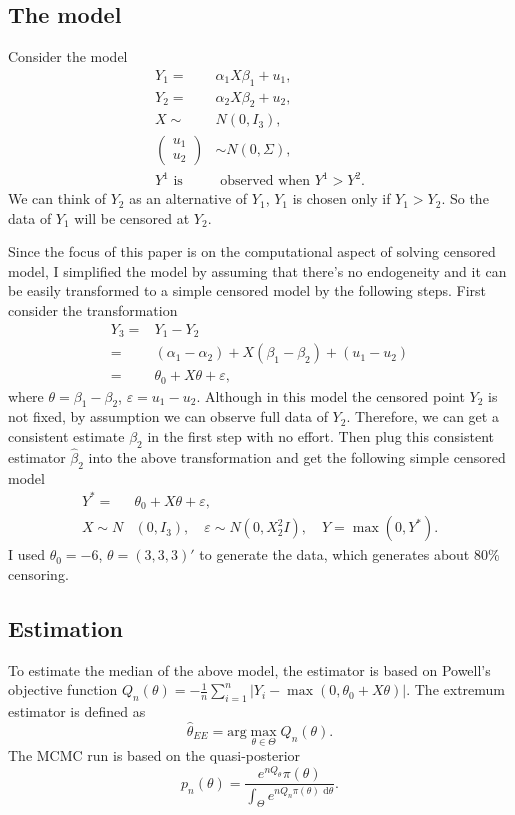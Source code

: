 \documentclass[12pt]{article}
\theoremstyle{plain} \newtheorem{theorem}{Theorem}
\theoremstyle{definition} \newtheorem{definition}{Definition}
\begin{document}
\subsection{The model}
Consider the model
\begin{align*}
  Y_1 = & \alpha_1 X\beta_1 +u_1, \\
  Y_2 = & \alpha_2 X\beta_2 +u_2, \\
  X \sim & N(0,I_3), \\
  \left( \begin{array}{c} u_1 \\ u_2 \end{array} \right)& \sim  N(0,\Sigma), \\
  Y^1 \mbox{ is}& \mbox{ observed when } Y^1> Y^2.
\end{align*}
We can think of $Y_2$ as an alternative of $Y_1$, $Y_1$ is chosen only if $Y_1>Y_2$. So the data of $Y_1$ will be censored at $Y_2$.

Since the focus of this paper is on the computational aspect of solving censored model, I simplified the model by assuming that there's no endogeneity and it can be easily transformed to a simple censored model by the following steps. First consider the transformation
\begin{align*}
  Y_3 = & Y_1 -Y_2 \\
  = & (\alpha_1 - \alpha_2) + X(\beta_1 - \beta_2) +(u_1 - u_2) \\
  = & \theta_0 + X\theta + \varepsilon,
\end{align*}
where $\theta = \beta_1 - \beta_2$, $\varepsilon = u_1 -u_2$. Although in this model the censored point $Y_2$ is not fixed, by assumption we can observe full data of $Y_2$. Therefore, we can get a consistent estimate $\beta_2$ in the first step with no effort. Then plug this consistent estimator $\hat{\beta}_2$ into the above transformation and get the following simple censored model
\begin{align*}
  Y^{*} = & \theta_0 + X\theta + \varepsilon, \\ 
  X\sim N&(0,I_3), \quad \varepsilon \sim  N(0,X_2^2I), \quad  Y =  \max(0,Y^{*}).
\end{align*}
I used $\theta_0 = -6$, $\theta = (3,3,3)'$ to generate the data, which generates about 80\% censoring.

\subsection{Estimation}
\label{sec:estimation}
To estimate the median of the above model, the estimator is based on Powell's objective function $Q_n(\theta) = -\frac{1}{n}\sum\limits_{i=1}^n|Y_i-\max(0,\theta_0+X\theta)|$. The extremum estimator is defined as
\begin{equation*}
    \hat{\theta}_{EE} = \mathrm{arg}\max_{\theta\in\Theta} Q_n(\theta).
\end{equation*}
The MCMC run is based on the quasi-posterior
\begin{equation*}
    p_n(\theta) = \frac{e^{nQ_{\theta}}\pi(\theta)}{\int_{\Theta}e^{nQ_n\pi(\theta)\mbox{ d}\theta}}.
\end{equation*}
\end{document}
